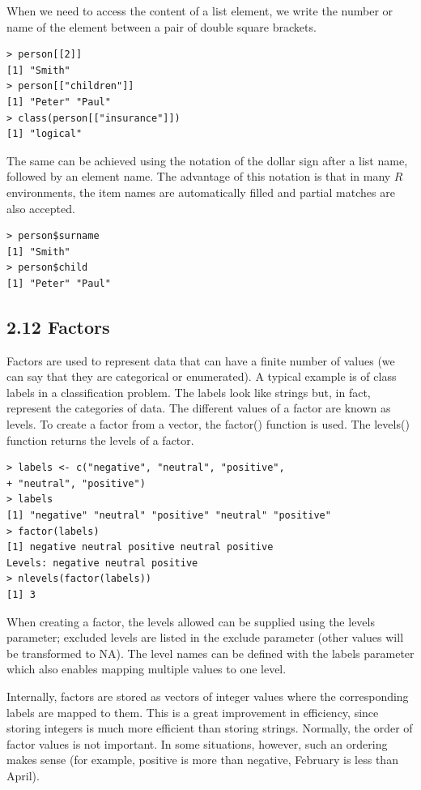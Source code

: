 \documentclass[10pt]{book}
\begin{document}
When we need to access the content of a list element, we write the number or name of the element between a pair of double square brackets.

\begin{verbatim}
> person[[2]]
[1] "Smith"
> person[["children"]]
[1] "Peter" "Paul"
> class(person[["insurance"]])
[1] "logical"
\end{verbatim}

The same can be achieved using the notation of the dollar sign after a list name, followed by an element name. The advantage of this notation is that in many $R$ environments, the item names are automatically filled and partial matches are also accepted.

\begin{verbatim}
> person$surname
[1] "Smith"
> person$child
[1] "Peter" "Paul"
\end{verbatim}

\subsection*{2.12 Factors}
Factors are used to represent data that can have a finite number of values (we can say that they are categorical or enumerated). A typical example is of class labels in a classification problem. The labels look like strings but, in fact, represent the categories of data. The different values of a factor are known as levels. To create a factor from a vector, the factor() function is used. The levels() function returns the levels of a factor.

\begin{verbatim}
> labels <- c("negative", "neutral", "positive",
+ "neutral", "positive")
> labels
[1] "negative" "neutral" "positive" "neutral" "positive"
> factor(labels)
[1] negative neutral positive neutral positive
Levels: negative neutral positive
> nlevels(factor(labels))
[1] 3
\end{verbatim}

When creating a factor, the levels allowed can be supplied using the levels parameter; excluded levels are listed in the exclude parameter (other values will be transformed to NA). The level names can be defined with the labels parameter which also enables mapping multiple values to one level.

Internally, factors are stored as vectors of integer values where the corresponding labels are mapped to them. This is a great improvement in efficiency, since storing integers is much more efficient than storing strings. Normally, the order of factor values is not important. In some situations, however, such an ordering makes sense (for example, positive is more than negative, February is less than April).
\end{document}

